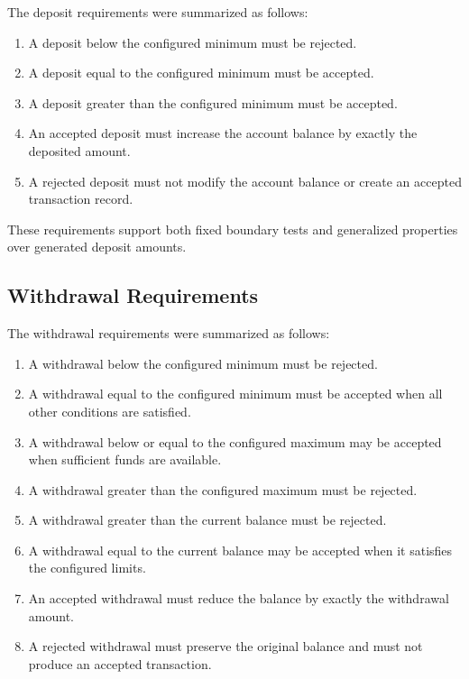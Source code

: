 \documentclass[12pt]{article}
\begin{document}
The deposit requirements were summarized as follows:

\begin{enumerate}[label=\textbf{D\arabic*:}]
    \item A deposit below the configured minimum must be rejected.
    \item A deposit equal to the configured minimum must be accepted.
    \item A deposit greater than the configured minimum must be accepted.
    \item An accepted deposit must increase the account balance by exactly the
          deposited amount.
    \item A rejected deposit must not modify the account balance or create an
          accepted transaction record.
\end{enumerate}

These requirements support both fixed boundary tests and generalized
properties over generated deposit amounts.

\subsection{Withdrawal Requirements}

The withdrawal requirements were summarized as follows:

\begin{enumerate}[label=\textbf{W\arabic*:}]
    \item A withdrawal below the configured minimum must be rejected.
    \item A withdrawal equal to the configured minimum must be accepted when
          all other conditions are satisfied.
    \item A withdrawal below or equal to the configured maximum may be
          accepted when sufficient funds are available.
    \item A withdrawal greater than the configured maximum must be rejected.
    \item A withdrawal greater than the current balance must be rejected.
    \item A withdrawal equal to the current balance may be accepted when it
          satisfies the configured limits.
    \item An accepted withdrawal must reduce the balance by exactly the
          withdrawal amount.
    \item A rejected withdrawal must preserve the original balance and must
          not produce an accepted transaction.
\end{enumerate}
\end{document}
